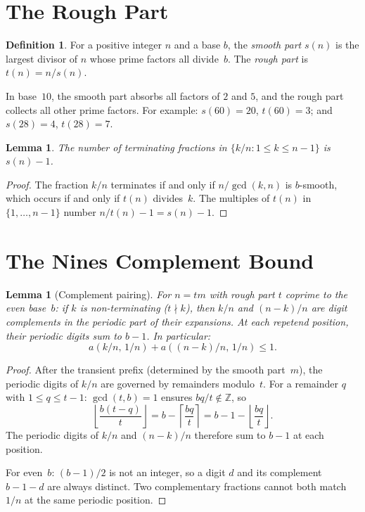 \documentclass[12pt]{amsart}
\newtheorem{lemma}[theorem]{Lemma}
\theoremstyle{definition}
\newtheorem{definition}[theorem]{Definition}
\theoremstyle{remark}
\begin{document}
\section{The Rough Part}

\begin{definition}
For a positive integer $n$ and a base $b$, the \emph{smooth part}
$s(n)$ is the largest divisor of $n$ whose prime factors all
divide~$b$. The \emph{rough part} is $t(n) = n / s(n)$.
\end{definition}

In base~$10$, the smooth part absorbs all factors of $2$ and $5$,
and the rough part collects all other prime factors. For example:
$s(60) = 20$, $t(60) = 3$; and $s(28) = 4$, $t(28) = 7$.

\begin{lemma}\label{lem:terminating-count}
The number of terminating fractions in $\{k/n : 1 \le k \le n{-}1\}$
is $s(n) - 1$.
\end{lemma}

\begin{proof}
The fraction $k/n$ terminates if and only if $n / \gcd(k,n)$ is
$b$-smooth, which occurs if and only if $t(n)$ divides~$k$. The
multiples of $t(n)$ in $\{1, \ldots, n{-}1\}$ number
$n/t(n) - 1 = s(n) - 1$.
\end{proof}

\section{The Nines Complement Bound}

\begin{lemma}[Complement pairing]\label{lem:complement}
For $n = tm$ with rough part $t$ coprime to the even
base~$b$: if $k$ is non-terminating ($t \nmid k$), then
$k/n$ and $(n{-}k)/n$ are digit complements in the
periodic part of their expansions. At each repetend
position, their periodic digits sum to $b - 1$. In
particular:
\[
a(k/n,\, 1/n) + a((n{-}k)/n,\, 1/n) \le 1.
\]
\end{lemma}

\begin{proof}
After the transient prefix (determined by the smooth
part~$m$), the periodic digits of $k/n$ are governed by
remainders modulo~$t$. For a remainder $q$ with
$1 \le q \le t{-}1$: $\gcd(t, b) = 1$ ensures
$bq/t \notin \mathbb{Z}$, so
\[
\left\lfloor \frac{b(t{-}q)}{t} \right\rfloor
= b - \left\lceil \frac{bq}{t} \right\rceil
= b - 1 - \left\lfloor \frac{bq}{t} \right\rfloor.
\]
The periodic digits of $k/n$ and $(n{-}k)/n$ therefore
sum to $b - 1$ at each position.

For even~$b$: $(b{-}1)/2$ is not an integer, so a digit
$d$ and its complement $b{-}1{-}d$ are always distinct.
Two complementary fractions cannot both match $1/n$ at
the same periodic position.
\end{proof}
\end{document}
